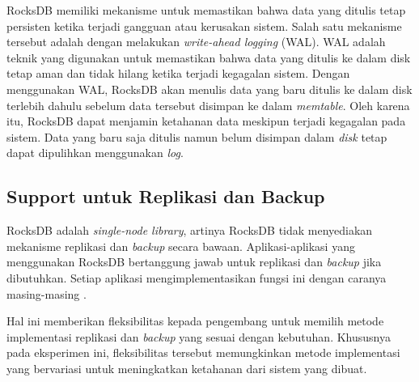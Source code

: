 RocksDB memiliki mekanisme untuk memastikan bahwa data yang ditulis tetap persisten ketika terjadi gangguan atau kerusakan sistem. Salah satu mekanisme tersebut adalah dengan melakukan \textit{write-ahead logging} (WAL). WAL adalah teknik yang digunakan untuk memastikan bahwa data yang ditulis ke dalam disk tetap aman dan tidak hilang ketika terjadi kegagalan sistem. Dengan menggunakan WAL, RocksDB akan menulis data yang baru ditulis ke dalam disk terlebih dahulu sebelum data tersebut disimpan ke dalam \textit{memtable}. Oleh karena itu, RocksDB dapat menjamin ketahanan data meskipun terjadi kegagalan pada sistem. Data yang baru saja ditulis namun belum disimpan dalam \textit{disk} tetap dapat dipulihkan menggunakan \textit{log}.

\subsection{Support untuk Replikasi dan Backup}

RocksDB adalah \textit{single-node library}, artinya RocksDB tidak menyediakan mekanisme replikasi dan \textit{backup} secara bawaan. Aplikasi-aplikasi yang menggunakan RocksDB bertanggung jawab untuk replikasi dan \textit{backup} jika dibutuhkan. Setiap aplikasi mengimplementasikan fungsi ini dengan caranya masing-masing \parencite{dong2021rocksdb}.

Hal ini memberikan fleksibilitas kepada pengembang untuk memilih metode implementasi replikasi dan \textit{backup} yang sesuai dengan kebutuhan. Khususnya pada eksperimen ini, fleksibilitas tersebut memungkinkan metode implementasi yang bervariasi untuk meningkatkan ketahanan dari sistem yang dibuat.
